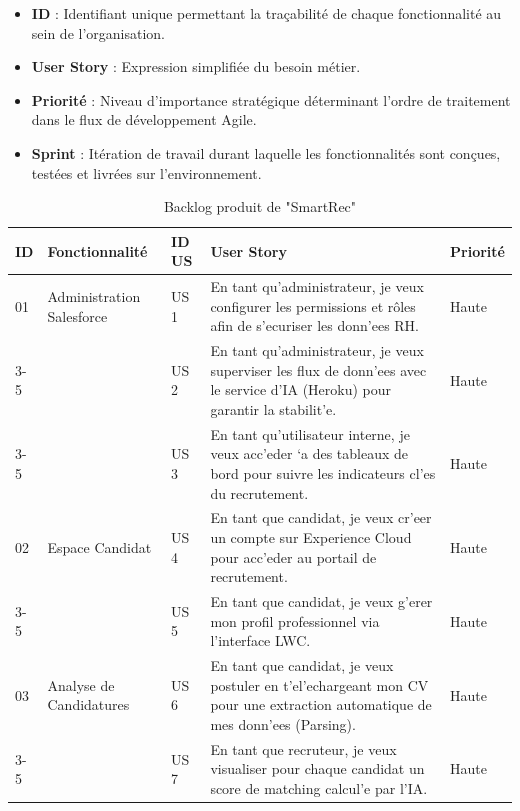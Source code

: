 \begin{itemize}[label=\textbullet]
\item \textbf{ ID } : Identifiant unique permettant la traçabilité de chaque fonctionnalité au sein de l'organisation.
\item \textbf{ User Story} : Expression simplifiée du besoin métier.
\item \textbf{ Priorité } : Niveau d'importance stratégique déterminant l'ordre de traitement dans le flux de développement Agile.
\item \textbf{Sprint} : Itération de travail durant laquelle les fonctionnalités sont conçues, testées et livrées sur l'environnement.\\
\end{itemize}

\begin{table}[H]
\caption{Backlog produit de "SmartRec"}
\centering
\renewcommand{\arraystretch}{1.4}
\begin{tabular}{|p{1.2cm}|p{3.5cm}|p{1.2cm}|p{7.5cm}|p{1.8cm}|}
\hline
\textbf{ID} & \textbf{Fonctionnalit\'e} & \textbf{ID US} & \textbf{User Story} & \textbf{Priorit\'e} \\
\hline

01 & Administration Salesforce & US 1 & En tant qu'administrateur, je veux configurer les permissions et rôles afin de s'ecuriser les donn'ees RH. & Haute \\
\cline{3-5}
& & US 2 & En tant qu'administrateur, je veux superviser les flux de donn'ees avec le service d'IA (Heroku) pour garantir la stabilit'e. & Haute \\
\cline{3-5}
& & US 3 & En tant qu'utilisateur interne, je veux acc'eder `a des tableaux de bord pour suivre les indicateurs cl'es du recrutement. & Haute \\
\hline

02 & Espace Candidat & US 4 & En tant que candidat, je veux cr'eer un compte sur Experience Cloud pour acc'eder au portail de recrutement. & Haute \\
\cline{3-5}
& & US 5 & En tant que candidat, je veux g'erer mon profil professionnel via l'interface LWC. & Haute \\
\hline

03 & Analyse de Candidatures & US 6 & En tant que candidat, je veux postuler en t'el'echargeant mon CV pour une extraction automatique de mes donn'ees (Parsing). & Haute \\
\cline{3-5}
& & US 7 & En tant que recruteur, je veux visualiser pour chaque candidat un score de matching calcul'e par l'IA. & Haute \\
\hline


\end{tabular}
\end{table}
